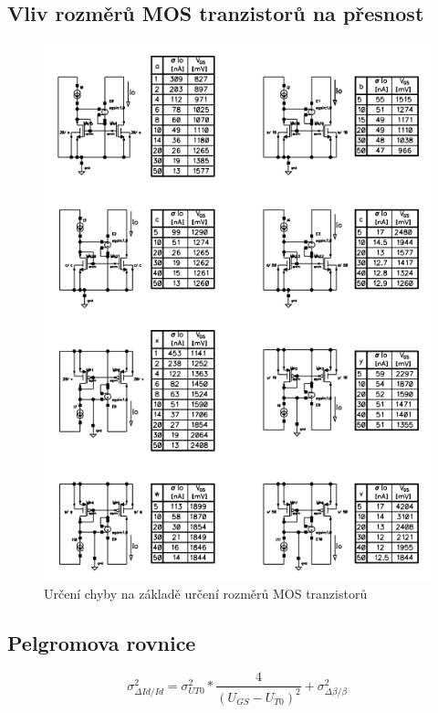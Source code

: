 \subsection{Vliv rozměrů MOS tranzistorů na přesnost}
\begin{figure}[h]
   \begin{center}
     \includegraphics[scale=0.8]{images/Presnost.png}
   \end{center}
   \caption{Určení chyby na základě určení rozměrů MOS tranzistorů}
\end{figure}

\subsection{Pelgromova rovnice}
\begin{equation}
\sigma_{\Delta Id/Id}^2=\sigma_{UT0}^2*\frac{4}{(U_{GS}-U_{T0})^2}+\sigma_{\Delta \beta / \beta}^2
\end{equation}

